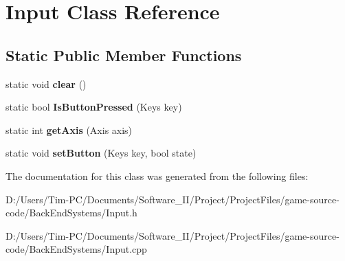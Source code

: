\hypertarget{class_input}{}\section{Input Class Reference}
\label{class_input}
\subsection*{Static Public Member Functions}
\begin{DoxyCompactItemize}
\item 
\mbox{\label{class_input_a137d26e571405f42b63c955958fd7c92}} 
static void {\bfseries clear} ()
\item 
\mbox{\label{class_input_abb8551549ffe7b1474aca91ce3509d57}} 
static bool {\bfseries Is\+Button\+Pressed} (Keys key)
\item 
\mbox{\label{class_input_a5c4b1c67c7d3e28d4af79601c81ed8bb}} 
static int {\bfseries get\+Axis} (Axis axis)
\item 
\mbox{\label{class_input_a851f7b43b30dcf7166af7c548d21316f}} 
static void {\bfseries set\+Button} (Keys key, bool state)
\end{DoxyCompactItemize}


The documentation for this class was generated from the following files\+:\begin{DoxyCompactItemize}
\item 
D\+:/\+Users/\+Tim-\/\+P\+C/\+Documents/\+Software\+\_\+\+I\+I/\+Project/\+Project\+Files/game-\/source-\/code/\+Back\+End\+Systems/Input.\+h\item 
D\+:/\+Users/\+Tim-\/\+P\+C/\+Documents/\+Software\+\_\+\+I\+I/\+Project/\+Project\+Files/game-\/source-\/code/\+Back\+End\+Systems/Input.\+cpp\end{DoxyCompactItemize}
